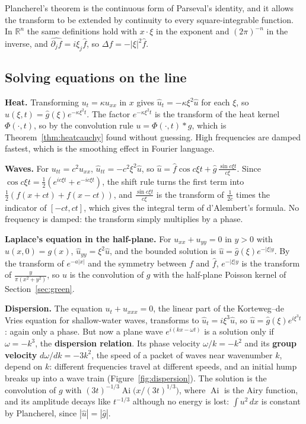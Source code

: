 \documentclass[11pt,a4paper]{article}
\numberwithin{equation}{section}
\theoremstyle{definition}
\begin{document}
Plancherel's theorem is the continuous form of Parseval's identity, and it allows the transform to be extended by continuity to every square-integrable function. In $\mathbb R^n$ the same definitions hold with $x\cdot\xi$ in the exponent and $(2\pi)^{-n}$ in the inverse, and $\widehat{\partial_jf} = i\xi_j\hat f$, so $\widehat{\Delta f} = -|\xi|^2\hat f$.

\subsection{Solving equations on the line}
\label{ssec:transformsolve}

\textbf{Heat.} Transforming $u_t = \kappa u_{xx}$ in $x$ gives $\hat u_t = -\kappa\xi^2\hat u$ for each $\xi$, so $\hat u(\xi, t) = \hat g(\xi)e^{-\kappa\xi^2t}$. The factor $e^{-\kappa\xi^2t}$ is the transform of the heat kernel $\Phi(\cdot, t)$, so by the convolution rule $u = \Phi(\cdot, t) * g$, which is Theorem~\ref{thm:heatcauchy} found
without guessing. High frequencies are damped fastest, which is the smoothing effect in Fourier language.

\textbf{Waves.} For $u_{tt} = c^2u_{xx}$, $\hat u_{tt} = -c^2\xi^2\hat u$, so $\hat u = \hat f\cos c\xi t + \hat g\,\frac{\sin c\xi t}{c\xi}$. Since $\cos c\xi t = \frac12(e^{ic\xi t} + e^{-ic\xi t})$, the shift rule turns the first term into $\frac12(f(x + ct) + f(x - ct))$, and $\frac{\sin c\xi t}{c\xi}$ is the transform of
$\frac1{2c}$ times the indicator of $[-ct, ct]$, which gives the integral term of d'Alembert's formula. No frequency is damped: the transform simply multiplies by a phase.

\textbf{Laplace's equation in the half-plane.} For $u_{xx} + u_{yy} = 0$ in $y > 0$ with $u(x, 0) = g(x)$, $\hat u_{yy} = \xi^2\hat u$, and the bounded solution is $\hat u = \hat g(\xi)e^{-|\xi|y}$. By the transform of $e^{-a|x|}$ and the symmetry between $f$ and $\hat f$, $e^{-|\xi|y}$ is the transform of $\frac{y}{\pi(x^2 + y^2)}$, so
$u$ is the convolution of $g$ with the half-plane Poisson kernel of Section~\ref{sec:green}.

\textbf{Dispersion.} The equation $u_t + u_{xxx} = 0$, the linear part of the Korteweg--de Vries equation for shallow-water waves, transforms to $\hat u_t = i\xi^3\hat u$, so $\hat u = \hat g(\xi)e^{i\xi^3t}$: again only a phase. But now a plane wave $e^{i(kx - \omega t)}$ is a solution only if $\omega = -k^3$, the
\textbf{dispersion relation}. Its phase velocity $\omega/k = -k^2$ and its \textbf{group velocity} $d\omega/dk = -3k^2$, the speed of a packet of waves near wavenumber $k$, depend on $k$: different frequencies travel at different speeds, and an initial hump breaks up into a wave train (Figure~\ref{fig:dispersion}). The
solution is the convolution of $g$ with $(3t)^{-1/3}\operatorname{Ai}\bigl(x/(3t)^{1/3}\bigr)$, where $\operatorname{Ai}$ is the Airy function, and its amplitude decays like $t^{-1/3}$ although no energy is lost: $\int u^2\,dx$ is constant by Plancherel, since $|\hat u| = |\hat g|$.
\end{document}
